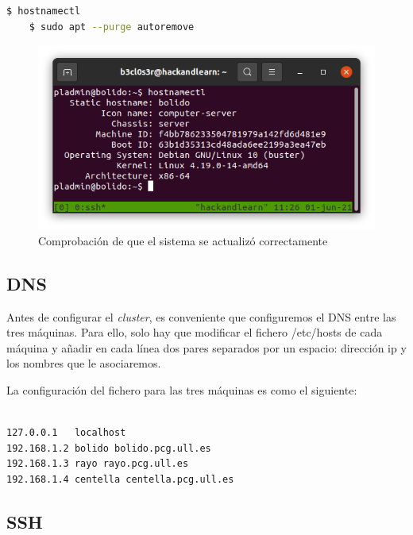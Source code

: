 \begin{lstlisting}[language=bash]
    $ hostnamectl
    $ sudo apt --purge autoremove
\end{lstlisting}

\begin{figure}[htb]
   \centering
   \includegraphics[width=0.9\linewidth]{images/hostnamectl.png}
   \caption{Comprobación de que el sistema se actualizó correctamente}
   \label{debian:hostname}
\end{figure}

\subsection{DNS}
\vspace{2mm}

Antes de configurar el \emph{cluster}, es conveniente que configuremos el DNS 
entre las tres máquinas. Para ello, solo hay que modificar el fichero /etc/hosts 
de cada máquina y añadir en cada línea dos pares separados por un espacio: dirección 
ip y los nombres que le asociaremos.
\vspace{2mm}

La configuración del fichero para las tres máquinas es como el siguiente:

\begin{lstlisting}[language=bash,caption={Fichero /etc/hosts},xleftmargin=.25\textwidth]

127.0.0.1	localhost 
192.168.1.2 bolido bolido.pcg.ull.es
192.168.1.3 rayo rayo.pcg.ull.es
192.168.1.4 centella centella.pcg.ull.es
\end{lstlisting}

\subsection{SSH}
\vspace{2mm}

